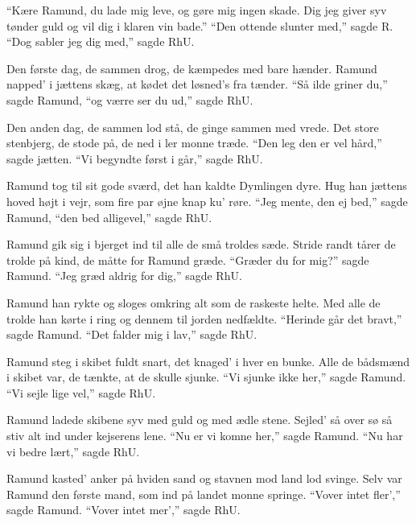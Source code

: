 \begin{paracol}{2}
\begin{guitar}
  ``Kære Ramund, du lade mig leve,
  og gøre mig ingen skade.
  Dig jeg giver syv tønder guld
  og vil dig i klaren vin bade.''
  ``Den ottende slunter med,'' sagde R.
  ``Dog sabler jeg dig med,'' sagde RhU.

  Den første dag, de sammen drog,
  de kæmpedes med bare hænder.
  Ramund napped' i jættens skæg,
  at kødet det løsned's fra tænder.
  ``Så ilde griner du,'' sagde Ramund,
  ``og værre ser du ud,'' sagde RhU.

  Den anden dag, de sammen lod stå,
  de ginge sammen med vrede.
  Det store stenbjerg, de stode på,
  de ned i ler monne træde.
  ``Den leg den er vel hård,'' sagde jætten.
  ``Vi begyndte først i går,'' sagde RhU.

  Ramund tog til sit gode sværd,
  det han kaldte Dymlingen dyre.
  Hug han jættens hoved højt i vejr,
  som fire par øjne knap ku' røre.
  ``Jeg mente, den ej bed,'' sagde Ramund,
  ``den bed alligevel,'' sagde RhU.
\end{guitar}

\switchcolumn

\begin{guitar}
  Ramund gik sig i bjerget ind
  til alle de små troldes sæde.
  Stride randt tårer de trolde på kind,
  de måtte for Ramund græde.
  ``Græder du for mig?'' sagde Ramund.
  ``Jeg græd aldrig for dig,'' sagde RhU.

  Ramund han rykte og sloges omkring
  alt som de raskeste helte.
  Med alle de trolde han kørte i ring
  og dennem til jorden nedfældte.
  ``Herinde går det bravt,'' sagde Ramund.
  ``Det falder mig i lav,'' sagde RhU.

  Ramund steg i skibet fuldt snart,
  det knaged' i hver en bunke.
  Alle de bådsmænd i skibet var,
  de tænkte, at de skulle sjunke.
  ``Vi sjunke ikke her,'' sagde Ramund.
  ``Vi sejle lige vel,'' sagde RhU.

  Ramund ladede skibene syv
  med guld og med ædle stene.
  Sejled' så over sø så stiv
  alt ind under kejserens lene.
  ``Nu er vi komne her,'' sagde Ramund.
  ``Nu har vi bedre lært,'' sagde RhU.

  Ramund kasted' anker på hviden sand
  og stavnen mod land lod svinge.
  Selv var Ramund den første mand,
  som ind på landet monne springe.
  ``Vover intet fler','' sagde Ramund.
  ``Vover intet mer','' sagde RhU.


\end{guitar}
\end{paracol}
